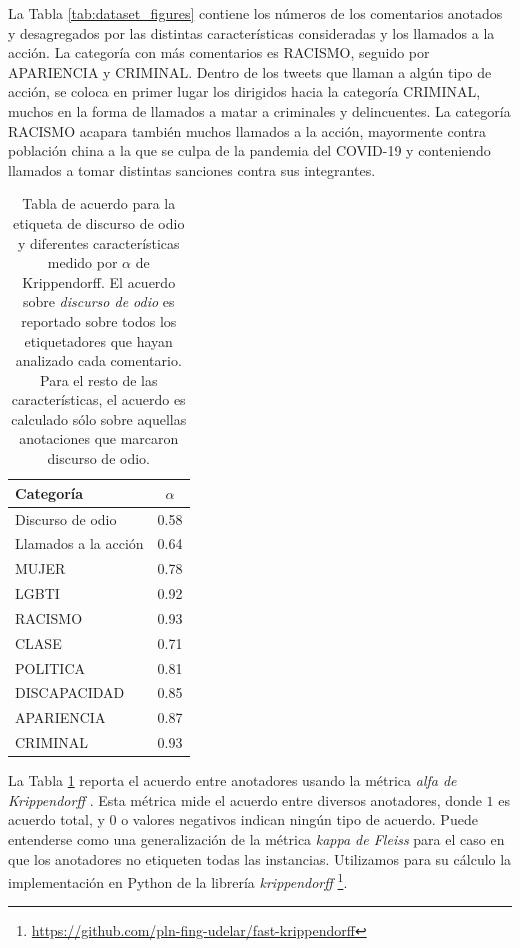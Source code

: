 
La Tabla \ref{tab:dataset_figures} contiene los números de los comentarios anotados y desagregados por las distintas características consideradas y los llamados a la acción. La categoría con más comentarios es RACISMO, seguido por APARIENCIA y CRIMINAL. Dentro de los tweets que llaman a algún tipo de acción, se coloca en primer lugar los dirigidos hacia la categoría CRIMINAL, muchos en la forma de llamados a matar a criminales y delincuentes. La categoría RACISMO acapara también muchos llamados a la acción, mayormente contra población china a la que se culpa de la pandemia del COVID-19 y conteniendo llamados a tomar distintas sanciones contra sus integrantes.


\begin{table}
    \centering
    \begin{tabular}{lc}
        \toprule
        Categoría   & $\alpha$  \\
        \midrule
        Discurso de odio     &  \num{0.58} \\
        Llamados a la acción &  \num{0.64} \\
        \hline
        MUJER                &  \num{0.78} \\
        LGBTI                &  \num{0.92} \\
        RACISMO              &  \num{0.93} \\
        CLASE                &  \num{0.71} \\
        POLITICA             &  \num{0.81} \\
        DISCAPACIDAD         &  \num{0.85} \\
        APARIENCIA           &  \num{0.87} \\
        CRIMINAL             &  \num{0.93} \\
        \bottomrule
    \end{tabular}
    \caption{Tabla de acuerdo para la etiqueta de discurso de odio y diferentes características medido por $\alpha$ de Krippendorff. El acuerdo sobre \emph{discurso de odio} es reportado sobre todos los etiquetadores que hayan analizado cada comentario. Para el resto de las características, el acuerdo es calculado sólo sobre aquellas anotaciones que marcaron discurso de odio.}
    \label{tab:annotation_agreement}
\end{table}

La Tabla \ref{tab:annotation_agreement} reporta el acuerdo entre anotadores usando la métrica \emph{alfa de Krippendorff} \cite{krippendorff2018content}. Esta métrica mide el acuerdo entre diversos anotadores, donde $1$ es acuerdo total, y 0 o valores negativos indican ningún tipo de acuerdo. Puede entenderse como una generalización de la métrica \emph{kappa de Fleiss} para el caso en que los anotadores no etiqueten todas las instancias. Utilizamos para su cálculo la implementación en Python de la librería \emph{krippendorff} \footnote{\url{https://github.com/pln-fing-udelar/fast-krippendorff}}.

